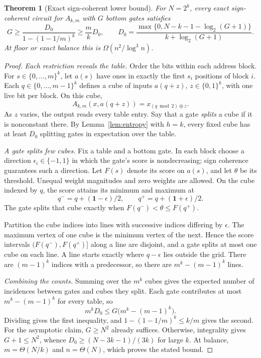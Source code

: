 \documentclass[11pt]{article}
\newtheorem{theorem}{Theorem}[section]
\newcommand{\bits}{\{0,1\}}
\begin{document}
\begin{theorem}[Exact sign-coherent lower bound]\label{thm:coherent}
For $N=2^k$, every exact sign-coherent circuit for $A_{k,m}$ with $G$
bottom gates satisfies
$$
G\ge\frac{D_0}{1-(1-1/m)^k}\ge\frac m kD_0,
\qquad
D_0=\frac{\max\{0,N-k-1-\log_2(G+1)\}}{k+\log_2(G+1)}.
$$
At floor or exact balance this is $\Omega(n^2/\log^3 n)$.
\end{theorem}
\begin{proof}
\emph{Each restriction reveals the table.}
Order the bits within each address block. For
$s\in\{0,\ldots,m\}^k$, let $a(s)$ have ones in exactly the first
$s_i$ positions of block $i$. Each $q\in\{0,\ldots,m-1\}^k$ defines
a cube of inputs $a(q+z)$, $z\in\bits^k$, with one live bit per block.
On this cube,
$$A_{k,m}(x,a(q+z))=x_{(q\bmod2)\oplus z}.$$
As $z$ varies, the output reads every table entry. Say that a gate
\emph{splits} a cube if it is nonconstant there. By
Lemma~\ref{lem:entropy} with $h=k$, every fixed cube has at least $D_0$
splitting gates in expectation over the table.

\emph{A gate splits few cubes.}
Fix a table and a bottom gate. In each block choose a direction
$\epsilon_i\in\{-1,1\}$ in which the gate's score is nondecreasing;
sign coherence guarantees such a direction. Let $F(s)$ denote its
score on $a(s)$, and let $\theta$ be its threshold. Unequal weight
magnitudes and zero weights are allowed. On the cube indexed by $q$,
the score attains its minimum and maximum at
$$q^-=q+(\mathbf1-\epsilon)/2,\qquad
q^+=q+(\mathbf1+\epsilon)/2.$$
The gate splits that cube exactly when
$F(q^-)<\theta\le F(q^+)$.

Partition the cube indices into lines with successive indices differing
by $\epsilon$. The maximum vertex of one cube is the minimum vertex
of the next. Hence the score intervals $(F(q^-),F(q^+)]$ along a line
are disjoint, and a gate splits at most one cube on each line.
A line starts exactly where $q-\epsilon$ lies outside the grid.
There are $(m-1)^k$ indices with a predecessor, so there are
$m^k-(m-1)^k$ lines.

\emph{Combining the counts.}
Summing over the $m^k$ cubes gives the expected number of incidences
between gates and cubes they split. Each gate contributes at most
$m^k-(m-1)^k$ for every table, so
$$m^kD_0\le G\bigl(m^k-(m-1)^k\bigr).$$
Dividing gives the first inequality, and
$1-(1-1/m)^k\le k/m$ gives the second.
For the asymptotic claim, $G\ge N^2$ already suffices. Otherwise,
integrality gives $G+1\le N^2$, whence
$D_0\ge(N-3k-1)/(3k)$ for large $k$. At balance,
$m=\Theta(N/k)$ and $n=\Theta(N)$, which proves the stated bound.
\end{proof}
\end{document}
